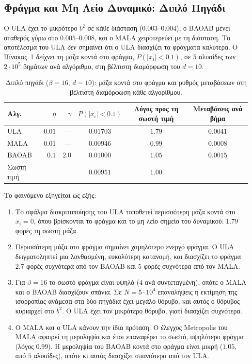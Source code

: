 \subsection{Φράγμα και Μη Λείο Δυναμικό: Διπλό Πηγάδι}
\label{sec:geo-double-well}

Ο ULA έχει το μικρότερο $b^2$ σε κάθε διάσταση ($0.003$--$0.004$), ο BAOAB μένει
σταθερός γύρω στο $0.005$--$0.008$, και ο MALA χειροτερεύει με τη διάσταση. Το
αποτέλεσμα του ULA \emph{δεν} σημαίνει ότι ο ULA διασχίζει τα φράγματα καλύτερα. Ο
Πίνακας~\ref{tab:double-well-barrier} δείχνει τη μάζα κοντά στο φράγμα,
$P(|x_i| < 0.1)$, σε $5$ αλυσίδες των $2 \cdot 10^5$ βημάτων ανά αλγόριθμο, στη
βέλτιστη διαμόρφωση του $d=10$.

\begin{table}[H]
\centering
\small
\begin{tabular}{lrrccc}
\toprule
Αλγ. & $\eta$ & $\gamma$ & $P(|x_i| < 0.1)$ & Λόγος προς τη σωστή τιμή & Μεταβάσεις ανά βήμα \\
\midrule
ULA   & $0.01$ & ---   & $0.01703$ & $1.79$ & $0.0041$ \\
MALA  & $0.01$ & ---   & $0.00946$ & $0.99$ & $0.0008$ \\
BAOAB & $0.1$  & $2.0$ & $0.01000$ & $1.05$ & $0.0015$ \\
\midrule
Σωστή τιμή & & & $0.00951$ & $1.00$ & \\
\bottomrule
\end{tabular}
\caption{Διπλό πηγάδι ($\beta = 16$, $d=10$): μάζα κοντά στο φράγμα και ρυθμός
μεταβάσεων στη βέλτιστη διαμόρφωση κάθε αλγορίθμου.}
\label{tab:double-well-barrier}
\end{table}

Το φαινόμενο εξηγείται ως εξής:

\begin{enumerate}
  \item Το σφάλμα διακριτοποίησης του ULA τοποθετεί περισσότερη μάζα κοντά στο $x_i = 0$,
        όπου βρίσκονται το φράγμα και το μη λείο σημείο του δυναμικού: $1.79$ φορές τη
        σωστή μάζα.
  \item Περισσότερη μάζα στο φράγμα σημαίνει χαμηλότερο ενεργό φράγμα. Ο ULA
        δειγματοληπτεί μια λανθασμένη, ευκολότερη κατανομή, και διασχίζει το φράγμα
        $2.7$ φορές συχνότερα από τον BAOAB και $5$ φορές συχνότερα από τον MALA.
  \item Για $\beta = 16$ το σωστό φράγμα είναι υψηλό ($4$ ανά συντεταγμένη), οπότε ο
        MALA και ο BAOAB διασχίζουν σπάνια. Σε $N = 5 \cdot 10^4$ επαναλήψεις η
        εκτίμηση της ισορροπίας ανάμεσα στα δύο πηγάδια έχει μεγάλο θόρυβο, και
        αυτός ο θόρυβος κυριαρχεί στο $b^2$. Ο ULA έχει τον μικρότερο θόρυβο, γιατί
        διασχίζει συχνότερα.
  \item Ο MALA και ο ULA κάνουν την ίδια πρόταση. Ο έλεγχος Metropolis του MALA
        αφαιρεί τη μεροληψία και έτσι επαναφέρει το σωστό, υψηλότερο φράγμα (λόγος
        $0.99$). Η μεροληψία του BAOAB κοντά στο φράγμα είναι μικρή ($1.05$, από $5$
        αλυσίδες), οπότε κι αυτός διασχίζει σπανιότερα από τον ULA.
\end{enumerate}

